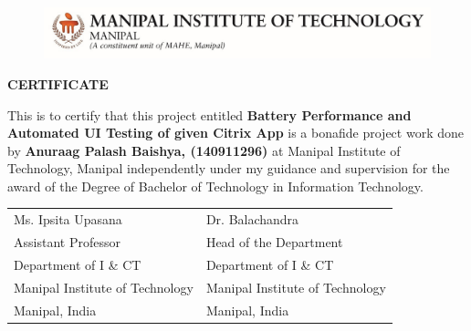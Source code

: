 \setlength\parindent{0pt}
\begin{figure}[bpht!]
	\begin{center}
		\includegraphics[scale=1]{MITLogo}
	\end{center}
\end{figure}
\begin{center}
	\large{\textbf{CERTIFICATE}}\\
\end{center}



This is to certify that this project entitled \textbf{Battery Performance and Automated UI Testing of given Citrix App} is a bonafide project work done by \textbf{Anuraag Palash Baishya, (140911296)} at Manipal Institute of Technology, Manipal independently under my guidance and supervision for the award of the Degree of Bachelor of Technology in Information Technology.



\vspace{4cm}

\begin{table}[h]
	\centering
		\begin{tabular}{p{3in} p{3in}}
			Ms. Ipsita Upasana &  Dr. Balachandra  \\
			Assistant Professor
 &    Head of the Department\\
			Department of I \& CT  &  Department of I \& CT \\
			 Manipal Institute of Technology& Manipal Institute of Technology\\
			Manipal, India &  Manipal, India 
		\end{tabular}
\end{table}
